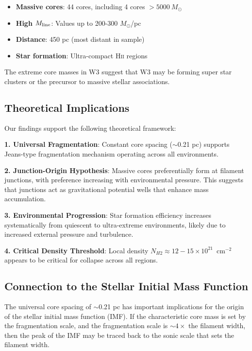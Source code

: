 \documentclass[11pt,a4paper]{article}
\begin{document}
\begin{itemize}
    \item \textbf{Massive cores}: 44 cores, including 4 cores $>5000~M_\odot$
    \item \textbf{High $M_{\rm line}$}: Values up to 200-300 $M_\odot$/pc
    \item \textbf{Distance}: 450 pc (most distant in sample)
    \item \textbf{Star formation}: Ultra-compact H\textsc{ii} regions
\end{itemize}

The extreme core masses in W3 suggest that W3 may be forming super star clusters or the precursor to massive stellar associations.

\subsection{Theoretical Implications}

Our findings support the following theoretical framework:

\textbf{1. Universal Fragmentation}: Constant core spacing ($\sim$0.21 pc) supports Jeans-type fragmentation mechanism operating across all environments.

\textbf{2. Junction-Origin Hypothesis}: Massive cores preferentially form at filament junctions, with preference increasing with environmental pressure. This suggests that junctions act as gravitational potential wells that enhance mass accumulation.

\textbf{3. Environmental Progression}: Star formation efficiency increases systematically from quiescent to ultra-extreme environments, likely due to increased external pressure and turbulence.

\textbf{4. Critical Density Threshold}: Local density $N_{H2} \approx 12-15 \times 10^{21}$~cm$^{-2}$ appears to be critical for collapse across all regions.

\subsection{Connection to the Stellar Initial Mass Function}

The universal core spacing of $\sim$0.21 pc has important implications for the origin of the stellar initial mass function (IMF). If the characteristic core mass is set by the fragmentation scale, and the fragmentation scale is $\sim 4\times$ the filament width, then the peak of the IMF may be traced back to the sonic scale that sets the filament width.
\end{document}
